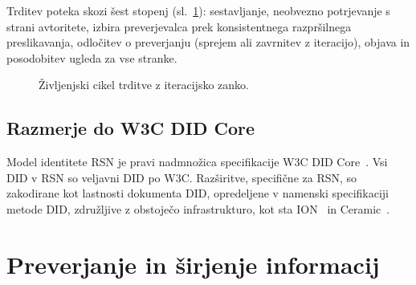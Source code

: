 \documentclass[11pt,a4paper,twocolumn]{article}
\begin{document}
Trditev poteka skozi šest stopenj (sl.~\ref{fig:lifecycle}): sestavljanje, neobvezno potrjevanje s strani avtoritete, izbira preverjevalca prek konsistentnega razpršilnega preslikavanja, odločitev o preverjanju (sprejem ali zavrnitev z iteracijo), objava in posodobitev ugleda za vse stranke.

\begin{figure}[ht]
\centering
{}
\caption{Življenjski cikel trditve z iteracijsko zanko.}
\label{fig:lifecycle}
\end{figure}

\subsection{Razmerje do W3C DID Core}

Model identitete RSN je pravi nadmnožica specifikacije W3C DID Core~\cite{did2022}. Vsi DID v RSN so veljavni DID po W3C. Razširitve, specifične za RSN, so zakodirane kot lastnosti dokumenta DID, opredeljene v namenski specifikaciji metode DID, združljive z obstoječo infrastrukturo, kot sta ION~\cite{buchner2021} in Ceramic~\cite{ceramic2023}.

\section{Preverjanje in širjenje informacij}
\end{document}
